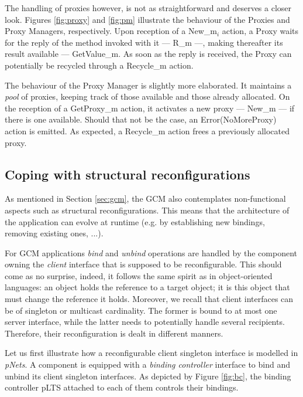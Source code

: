 	
	The handling of proxies however, is not as straightforward and deserves a closer look.
	Figures \ref{fig:proxy} and \ref{fig:pm} illustrate the behaviour of the \textsf{Proxies} and \textsf{Proxy Managers}, respectively. 
	Upon reception of a \textsf{New\_m$_i$} action, a \textsf{Proxy} waits for the reply of the method invoked with it --- \textsf{R\_m} ---,
	making thereafter its result available --- \textsf{GetValue\_m}.  As soon as the reply is
	received, the \textsf{Proxy} can potentially be recycled through a \textsf{Recycle\_m}
	action.
				
		The behaviour of the \textsf{Proxy Manager} is slightly more elaborated. It maintains a \textit{pool} of proxies, keeping track of 
  those available and those already allocated. On the reception of a \textsf{GetProxy\_m} action, it activates a new proxy 
  --- \textsf{New\_m} --- if there is one available. Should that not be the case, an \textsf{Error(NoMoreProxy)} action is emitted.  
	As expected, a \textsf{Recycle\_m} action frees a previously allocated proxy. 	
	
	
\subsection{Coping with structural reconfigurations}
\label{sub:reconfig}	


		As mentioned in Section \ref{sec:gcm}, the \ac{GCM} also contemplates non-functional
	aspects such as structural reconfigurations. This means that the architecture
	of the application can evolve at runtime (e.g. by establishing new bindings, 
	removing existing ones, ...).
		
	For \ac{GCM} applications \textit{bind} and \textit{unbind} operations are handled by the component
	owning the \textit{client} interface that is supposed to be reconfigurable. This should come
	as no surprise, indeed, it follows the same spirit as in object-oriented languages: an object
	holds the reference to a target object; it is this object that must change the reference it holds.
	Moreover, we recall that client interfaces can be of singleton or multicast cardinality.
	The former is bound to at most one server interface, while the latter needs to potentially 
	handle several recipients. Therefore, their reconfiguration is dealt in different manners. 
	
	Let us first illustrate how a reconfigurable client singleton interface is modelled in \textit{pNets}. 
	A component is equipped with a \textit{binding controller} interface to bind and unbind	its
	client singleton interfaces. As depicted by Figure \ref{fig:bc}, the binding controller pLTS attached
	to each of them controls their bindings.
	
